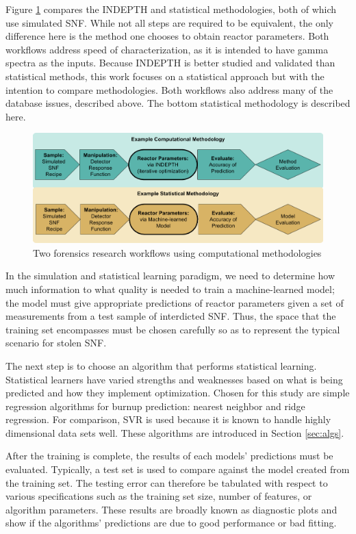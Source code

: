 Figure \ref{fig:compworkflow} compares the \gls{INDEPTH} and statistical
methodologies, both of which use simulated \gls{SNF}.  While not all steps are
required to be equivalent, the only difference here is the method one chooses
to obtain reactor parameters. Both workflows address speed of characterization,
as it is intended to have gamma spectra as the inputs.  Because \gls{INDEPTH}
is better studied and validated than statistical methods,  this work
focuses on a statistical approach but with the intention to compare
methodologies.  Both workflows also address many of the database issues,
described above. The bottom statistical methodology is described here.
\\
\begin{figure}[!tbh]
  \includegraphics[width=\linewidth]{./chapters/intro/CompStatForensicsWorkflow.png}
  \caption{Two forensics research workflows using computational methodologies}
  \label{fig:compworkflow}
\end{figure}

In the simulation and statistical learning paradigm, we need to determine how
much information to what quality is needed to train a machine-learned model;
the model must give appropriate predictions of reactor parameters given a set
of measurements from a test sample of interdicted \gls{SNF}. Thus, the space 
that the training set encompasses must be chosen carefully so as to represent 
the typical scenario for stolen \gls{SNF}.

The next step is to choose an algorithm that performs statistical learning.
Statistical learners have varied strengths and weaknesses based on what is
being predicted and how they implement optimization.  Chosen for this study are
simple regression algorithms for burnup prediction: nearest neighbor and ridge
regression.  For comparison, \gls{SVR} is used because it is known to handle
highly dimensional data sets well.  These algorithms are introduced in Section
\ref{sec:algs}.

After the training is complete, the results of each models' predictions must be
evaluated.  Typically, a test set is used to compare against the model created
from the training set.  The testing error can therefore be tabulated with
respect to various specifications such as the training set size, number of
features, or algorithm parameters. These results are broadly known as
diagnostic plots and show if the algorithms' predictions are due to good
performance or bad fitting. 

